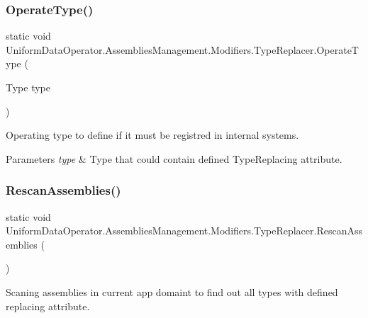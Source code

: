 \subsubsection{\texorpdfstring{Operate\+Type()}{OperateType()}}
{\footnotesize\ttfamily static void Uniform\+Data\+Operator.\+Assemblies\+Management.\+Modifiers.\+Type\+Replacer.\+Operate\+Type (\begin{DoxyParamCaption}\item[{Type}]{type }\end{DoxyParamCaption})\hspace{0.3cm}{\ttfamily [static]}}



Operating type to define if it must be registred in internal systems. 


\begin{DoxyParams}{Parameters}
{\em type} & Type that could contain defined {\ttfamily Type\+Replacing} attribute.\\
\hline
\end{DoxyParams}
\mbox{\label{class_uniform_data_operator_1_1_assemblies_management_1_1_modifiers_1_1_type_replacer_a3fc9dceab9bd6da387ce1be9213aaa9e}} 
\subsubsection{\texorpdfstring{Rescan\+Assemblies()}{RescanAssemblies()}}
{\footnotesize\ttfamily static void Uniform\+Data\+Operator.\+Assemblies\+Management.\+Modifiers.\+Type\+Replacer.\+Rescan\+Assemblies (\begin{DoxyParamCaption}{ }\end{DoxyParamCaption})\hspace{0.3cm}{\ttfamily [static]}}



Scaning assemblies in current app domaint to find out all types with defined replacing attribute. 



